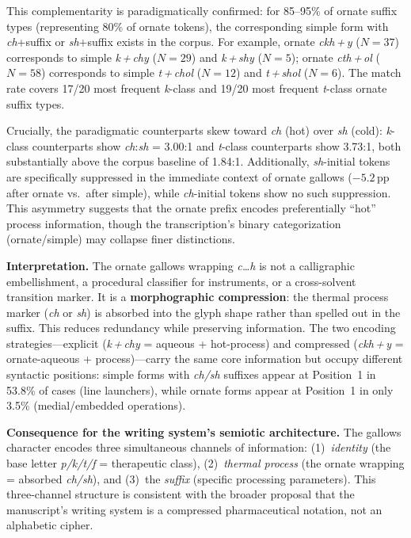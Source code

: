 \documentclass[11pt,a4paper]{article}
\begin{document}
This complementarity is paradigmatically confirmed: for 85--95\% of ornate suffix types (representing 80\% of ornate tokens), the corresponding simple form with \textit{ch}+suffix or \textit{sh}+suffix exists in the corpus. For example, ornate \textit{ckh\,+\,y} ($N=37$) corresponds to simple \textit{k\,+\,chy} ($N=29$) and \textit{k\,+\,shy} ($N=5$); ornate \textit{cth\,+\,ol} ($N=58$) corresponds to simple \textit{t\,+\,chol} ($N=12$) and \textit{t\,+\,shol} ($N=6$). The match rate covers 17/20 most frequent \textit{k}-class and 19/20 most frequent \textit{t}-class ornate suffix types.

Crucially, the paradigmatic counterparts skew toward \textit{ch} (hot) over \textit{sh} (cold): \textit{k}-class counterparts show \textit{ch}:\textit{sh} = 3.00:1 and \textit{t}-class counterparts show 3.73:1, both substantially above the corpus baseline of 1.84:1. Additionally, \textit{sh}-initial tokens are specifically suppressed in the immediate context of ornate gallows ($-5.2$\,pp after ornate vs.\ after simple), while \textit{ch}-initial tokens show no such suppression. This asymmetry suggests that the ornate prefix encodes preferentially ``hot'' process information, though the transcription's binary categorization (ornate/simple) may collapse finer distinctions.

\textbf{Interpretation.} The ornate gallows wrapping \textit{c\ldots h} is not a calligraphic embellishment, a procedural classifier for instruments, or a cross-solvent transition marker. It is a \textbf{morphographic compression}: the thermal process marker (\textit{ch} or \textit{sh}) is absorbed into the glyph shape rather than spelled out in the suffix. This reduces redundancy while preserving information. The two encoding strategies---explicit (\textit{k\,+\,chy} = aqueous + hot-process) and compressed (\textit{ckh\,+\,y} = ornate-aqueous + process)---carry the same core information but occupy different syntactic positions: simple forms with \textit{ch/sh} suffixes appear at Position~1 in 53.8\% of cases (line launchers), while ornate forms appear at Position~1 in only 3.5\% (medial/embedded operations).

\textbf{Consequence for the writing system's semiotic architecture.} The gallows character encodes three simultaneous channels of information: (1)~\textit{identity} (the base letter \textit{p/k/t/f} = therapeutic class), (2)~\textit{thermal process} (the ornate wrapping = absorbed \textit{ch/sh}), and (3)~the \textit{suffix} (specific processing parameters). This three-channel structure is consistent with the broader proposal that the manuscript's writing system is a compressed pharmaceutical notation, not an alphabetic cipher.
\end{document}
